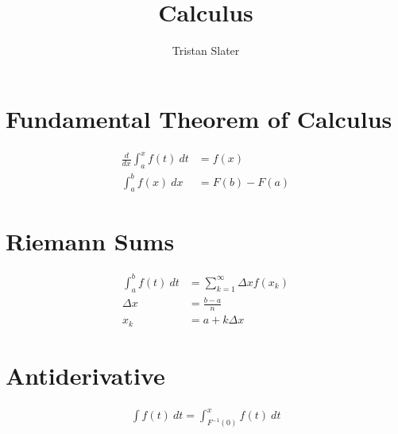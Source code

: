 \documentclass{article}
\title{Calculus}
\author{Tristan Slater}
\begin{document}
    \maketitle

    \section{Fundamental Theorem of Calculus}

    \begin{align}
        \frac{d}{dx}{\int_a^x{f(t)\ dt}} &= f(x) \\
        \int_a^b{f(x)\ dx} &= F(b) - F(a)
    \end{align}

    \section{Riemann Sums}

    \begin{align}
        \int_a^b{f(t)\ dt} &= \sum_{k = 1}^\infty{\Delta x f(x_k)} \\
        \Delta x &= \frac{b - a}{n} \\
        x_k &= a + k\Delta x
    \end{align}
    
    \section{Antiderivative}
    
    \begin{align}
        \int{f(t)\ dt} = \int_{F^{-1}(0)}^x{f(t)\ dt}
    \end{align}
\end{document}
